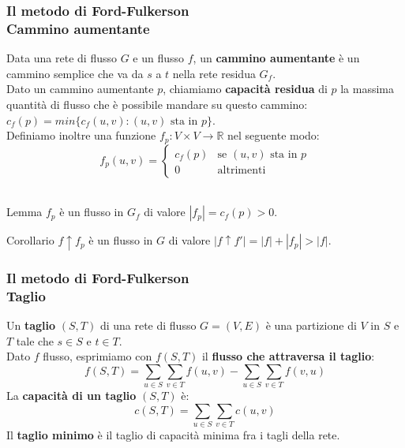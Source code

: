 \documentclass{beamer}
\begin{document}
\begin{frame}
\frametitle{Il metodo di Ford-Fulkerson\\Cammino aumentante}
Data una rete di flusso $G$ e un flusso $f$, un \textbf{cammino aumentante} è un cammino semplice che va da $s$ a $t$ nella rete residua $G_f$.\\
Dato un cammino aumentante $p$, chiamiamo \textbf{capacità residua} di $p$ la massima quantità di flusso che è possibile mandare su questo cammino:\\
$c_f(p)=min\{c_f(u,v):(u,v) \mbox{ sta in } p\}$.\\
Definiamo inoltre una funzione $f_p:V\times V\rightarrow \mathbb{R}$ nel seguente modo:\\
$$f_p(u,v) =
\left\{
	\begin{array}{ll}
		c_f(p) & \mbox{se } (u,v) \mbox{ sta in } p\\
		0 & \mbox{altrimenti}
	\end{array}
\right.$$\\
\begin{block}{Lemma}
$f_p$ è un flusso in $G_f$ di valore $|f_p|=c_f(p)>0$.
\end{block}
\begin{block}{Corollario}
$f\uparrow f_p$ è un flusso in $G$ di valore $|f\uparrow f'|=|f|+|f_p|>|f|.$
\end{block}
\end{frame}

\begin{frame}
\frametitle{Il metodo di Ford-Fulkerson\\Taglio}
Un \textbf{taglio} $(S,T)$ di una rete di flusso $G=(V,E)$ è una partizione di $V$ in $S$ e $T$ tale che $s\in S$ e $t\in T$.\\
Dato $f$ flusso, esprimiamo con $f(S,T)$ il \textbf{flusso che attraversa il taglio}:
$$f(S,T)=\sum\limits_{u\in S}\sum\limits_{v\in T}f(u,v)-
         \sum\limits_{u\in S}\sum\limits_{v\in T}f(v,u)$$
La \textbf{capacità di un taglio} $(S,T)$ è:
$$c(S,T)=\sum\limits_{u\in S}\sum\limits_{v\in T}c(u,v)$$
Il \textbf{taglio minimo} è il taglio di capacità minima fra i tagli della rete.
\end{frame}
\end{document}
